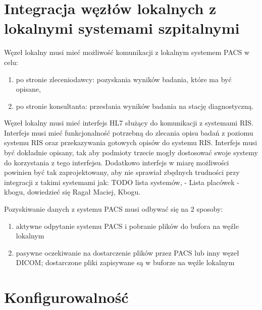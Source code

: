\documentclass[a4paper]{report}
\begin{document}
\section{Integracja węzłów lokalnych z lokalnymi systemami szpitalnymi}

Węzeł lokalny musi mieć możliwość komunikacji z lokalnym systemem PACS w celu:
\begin{enumerate}
 \item po stronie zleceniodawcy: pozyskania wyników badania, które ma być opisane,
 \item po stronie konsultanta: przesłania wyników badania na stację diagnostyczną.
\end{enumerate}

Węzeł lokalny musi mieć interfejs HL7 służący do komunikacji z systemami RIS. Interfejs musi mieć funkcjonalność potrzebną do zlecania opisu badań z poziomu systemu RIS oraz przekazywania gotowych opisów do systemu RIS. Interfejs musi być dokładnie opisany, tak aby podmioty trzecie mogły dostosować swoje systemy do korzystania z tego interfejsu. Dodatkowo interfejs w miarę możliwości powinien być tak zaprojektowany, aby nie sprawiał zbędnych trudności przy integracji z takimi systemami jak: TODO lista systemów, - Lista placówek - kbogu, dowiedzieć się Ragał Maciej, Kbogu. 

Pozyskiwanie danych z systemu PACS musi odbywać się na 2 sposoby:
\begin{enumerate}
  \item aktywne odpytanie systemu PACS i pobranie plików do bufora na węźle lokalnym
  \item pasywne oczekiwanie na dostarczenie plików przez PACS lub inny węzeł DICOM; dostarczone pliki zapisywane są w buforze na węźle lokalnym
\end{enumerate}

\section{Konfigurowalność}
\label{zlecenia-konfig}
\end{document}
